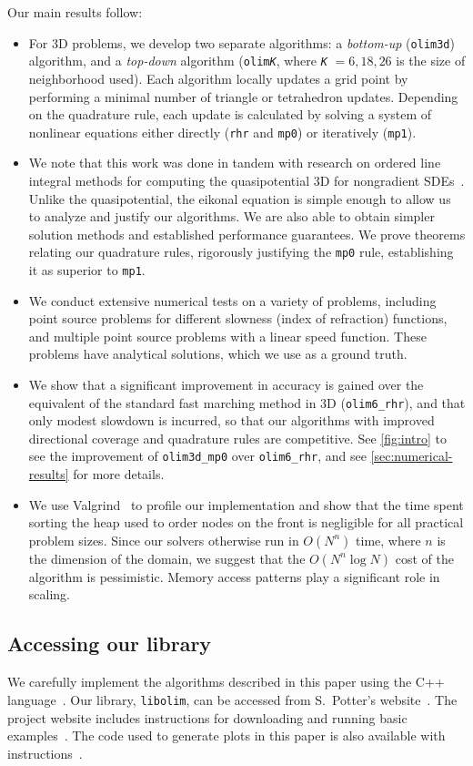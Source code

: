 \documentclass[eikonal.tex]{subfiles}
\begin{document}
Our main results follow:
\begin{itemize}
\item For 3D problems, we develop two separate algorithms: a
  \emph{bottom-up} (\texttt{olim3d}) algorithm, and a \emph{top-down}
  algorithm (\texttt{olim\emph{K}}, where \texttt{\emph{K}}
  \hspace{-0.1em}$=6,18,26$ is the size of neighborhood used). Each
  algorithm locally updates a grid point by performing a minimal
  number of triangle or tetrahedron updates. Depending on the
  quadrature rule, each update is calculated by solving a system of
  nonlinear equations either directly (\texttt{rhr} and \texttt{mp0})
  or iteratively (\texttt{mp1}).
\item We note that this work was done in tandem with research on
  ordered line integral methods for computing the quasipotential 3D
  for nongradient
  SDEs~\cite{dahiya2017ordered,yang2019computing,dahiya2018ordered}. Unlike
  the quasipotential, the eikonal equation is simple enough to allow
  us to analyze and justify our algorithms. We are also able to obtain
  simpler solution methods and established performance guarantees. We
  prove theorems relating our quadrature rules, rigorously justifying
  the \texttt{mp0} rule, establishing it as superior to \texttt{mp1}.
\item We conduct extensive numerical tests on a variety of problems,
  including point source problems for different slowness (index of
  refraction) functions, and multiple point source problems with a
  linear speed function. These problems have analytical solutions,
  which we use as a ground truth.
\item We show that a significant improvement in accuracy is gained
  over the equivalent of the standard fast marching method in 3D
  (\texttt{olim6\_rhr}), and that only modest slowdown is incurred, so
  that our algorithms with improved directional coverage and
  quadrature rules are competitive. See \cref{fig:intro} to see the
  improvement of \texttt{olim3d\_mp0} over \texttt{olim6\_rhr}, and
  see \cref{sec:numerical-results} for more details.
\item We use Valgrind~\cite{nethercote2007valgrind} to profile our
  implementation and show that the time spent sorting the heap used to
  order nodes on the front is negligible for all practical problem
  sizes. Since our solvers otherwise run in $O(N^n)$ time, where $n$
  is the dimension of the domain, we suggest that the $O(N^n \log N)$
  cost of the algorithm is pessimistic. Memory access patterns play a
  significant role in scaling.
\end{itemize}

\subsection{Accessing our library} We carefully implement the
algorithms described in this paper using the C++
language~\cite{stroustrup2013c++}. Our library, \texttt{libolim}, can
be accessed from S.\ Potter's website~\cite{sfp-umiacs-homepage}. The
project website includes instructions for downloading and running
basic examples~\cite{libolim-github}. The code used to generate plots
in this paper is also available with
instructions~\cite{libolim-github-plotting}.
\end{document}
